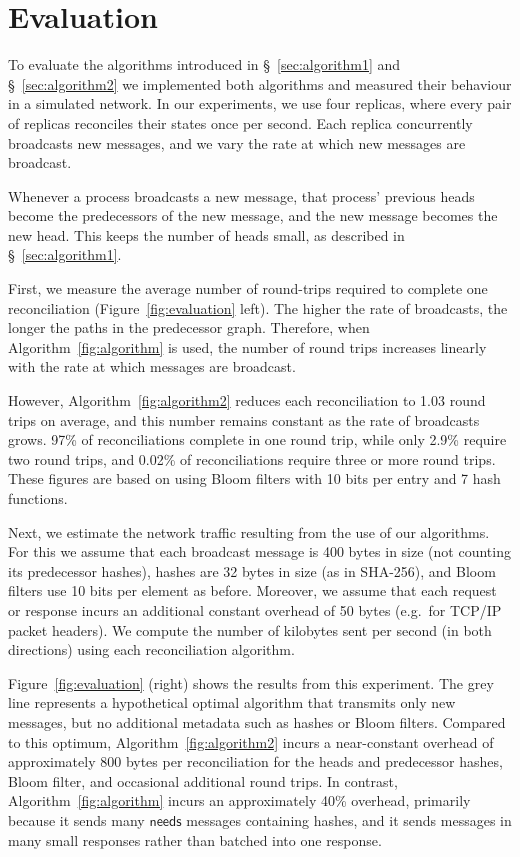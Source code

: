 \documentclass[a4paper,anonymous,USenglish]{lipics-v2019}
\begin{document}
\section{Evaluation}\label{sec:evaluation}

To evaluate the algorithms introduced in \S~\ref{sec:algorithm1} and \S~\ref{sec:algorithm2} we implemented both algorithms and measured their behaviour in a simulated network.
In our experiments, we use four replicas, where every pair of replicas reconciles their states once per second.
Each replica concurrently broadcasts new messages, and we vary the rate at which new messages are broadcast.

Whenever a process broadcasts a new message, that process' previous heads become the predecessors of the new message, and the new message becomes the new head.
This keeps the number of heads small, as described in \S~\ref{sec:algorithm1}.

First, we measure the average number of round-trips required to complete one reconciliation (Figure~\ref{fig:evaluation} left).
The higher the rate of broadcasts, the longer the paths in the predecessor graph.
Therefore, when Algorithm~\ref{fig:algorithm} is used, the number of round trips increases linearly with the rate at which messages are broadcast.

However, Algorithm~\ref{fig:algorithm2} reduces each reconciliation to 1.03 round trips on average, and this number remains constant as the rate of broadcasts grows.
97\% of reconciliations complete in one round trip, while only 2.9\% require two round trips, and 0.02\% of reconciliations require three or more round trips.
These figures are based on using Bloom filters with 10 bits per entry and 7 hash functions.

Next, we estimate the network traffic resulting from the use of our algorithms.
For this we assume that each broadcast message is 400 bytes in size (not counting its predecessor hashes), hashes are 32 bytes in size (as in SHA-256), and Bloom filters use 10 bits per element as before.
Moreover, we assume that each request or response incurs an additional constant overhead of 50 bytes (e.g.\ for TCP/IP packet headers).
We compute the number of kilobytes sent per second (in both directions) using each reconciliation algorithm.

Figure~\ref{fig:evaluation} (right) shows the results from this experiment.
The grey line represents a hypothetical optimal algorithm that transmits only new messages, but no additional metadata such as hashes or Bloom filters.
Compared to this optimum, Algorithm~\ref{fig:algorithm2} incurs a near-constant overhead of approximately 800 bytes per reconciliation for the heads and predecessor hashes, Bloom filter, and occasional additional round trips.
In contrast, Algorithm~\ref{fig:algorithm} incurs an approximately 40\% overhead, primarily because it sends many $\mathsf{needs}$ messages containing hashes, and it sends messages in many small responses rather than batched into one response.
\end{document}
